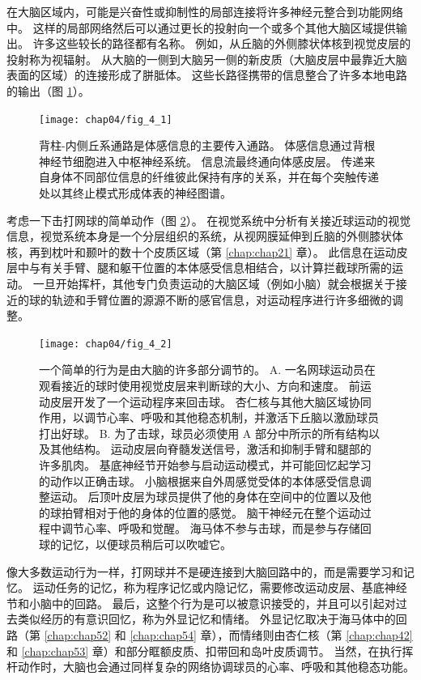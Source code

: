 在大脑区域内，可能是兴奋性或抑制性的局部连接将许多神经元整合到功能网络中。 
这样的局部网络然后可以通过更长的投射向一个或多个其他大脑区域提供输出。 
许多这些较长的路径都有名称。 
例如，从丘脑的外侧膝状体核到视觉皮层的投射称为视辐射。 
从大脑的一侧到大脑另一侧的新皮质（大脑皮层中最靠近大脑表面的区域）的连接形成了胼胝体。 
这些长路径携带的信息整合了许多本地电路的输出（图 \ref{fig:4_1}）。

\begin{figure}[htbp]
	\centering
	\texttt{[image: chap04/fig\_4\_1]}
	\caption{背柱-内侧丘系通路是体感信息的主要传入通路。 
		体感信息通过背根神经节细胞进入中枢神经系统。 
		信息流最终通向体感皮层。 
		传递来自身体不同部位信息的纤维彼此保持有序的关系，并在每个突触传递处以其终止模式形成体表的神经图谱。}
	\label{fig:4_1}
\end{figure}


考虑一下击打网球的简单动作（图 \ref{fig:4_2}）。 
在视觉系统中分析有关接近球运动的视觉信息，视觉系统本身是一个分层组织的系统，从视网膜延伸到丘脑的外侧膝状体核，再到枕叶和颞叶的数十个皮质区域（第 \ref{chap:chap21} 章）。
此信息在运动皮层中与有关手臂、腿和躯干位置的本体感受信息相结合，以计算拦截球所需的运动。 
一旦开始挥杆，其他专门负责运动的大脑区域（例如小脑）就会根据关于接近的球的轨迹和手臂位置的源源不断的感官信息，对运动程序进行许多细微的调整。

\begin{figure}[htbp]
	\centering
	\texttt{[image: chap04/fig\_4\_2]}
	\caption{一个简单的行为是由大脑的许多部分调节的。 
		A. 一名网球运动员在观看接近的球时使用视觉皮层来判断球的大小、方向和速度。 
		前运动皮层开发了一个运动程序来回击球。 
		杏仁核与其他大脑区域协同作用，以调节心率、呼吸和其他稳态机制，并激活下丘脑以激励球员打出好球。 
		B. 为了击球，球员必须使用 A 部分中所示的所有结构以及其他结构。 
		运动皮层向脊髓发送信号，激活和抑制手臂和腿部的许多肌肉。 
		基底神经节开始参与启动运动模式，并可能回忆起学习的动作以正确击球。 
		小脑根据来自外周感觉受体的本体感受信息调整运动。 
		后顶叶皮层为球员提供了他的身体在空间中的位置以及他的球拍臂相对于他的身体的位置的感觉。 
		脑干神经元在整个运动过程中调节心率、呼吸和觉醒。 
		海马体不参与击球，而是参与存储回球的记忆，以便球员稍后可以吹嘘它。}
	\label{fig:4_2}
\end{figure}


像大多数运动行为一样，打网球并不是硬连接到大脑回路中的，而是需要学习和记忆。 
运动任务的记忆，称为程序记忆或内隐记忆，需要修改运动皮层、基底神经节和小脑中的回路。 
最后，这整个行为是可以被意识接受的，并且可以引起对过去类似经历的有意识回忆，称为外显记忆和情绪。 
外显记忆取决于海马体中的回路（第 \ref{chap:chap52} 和 \ref{chap:chap54} 章），而情绪则由杏仁核（第 \ref{chap:chap42} 和 \ref{chap:chap53} 章）和部分眶额皮质、扣带回和岛叶皮质调节。 
当然，在执行挥杆动作时，大脑也会通过同样复杂的网络协调球员的心率、呼吸和其他稳态功能。



